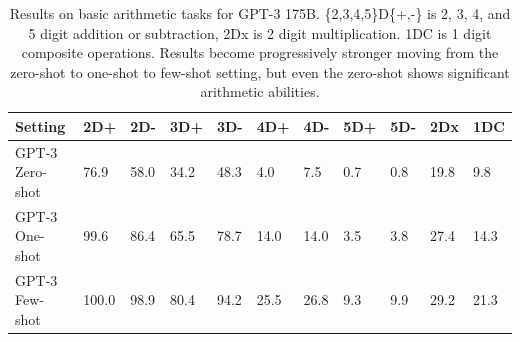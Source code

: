 \begin{table}
    \centering
        \begin{tabular}{l l l l l l l l l l l}
        \toprule
        Setting & 2D+ & 2D- & 3D+ & 3D- & 4D+ & 4D- & 5D+ & 5D- & 2Dx & 1DC \\ 
        \midrule
        GPT-3 Zero-shot & 76.9 & 58.0 & 34.2 & 48.3 & 4.0 & 7.5 & 0.7 & 0.8 & 19.8 & 9.8 \\ 
        GPT-3 One-shot & 99.6 & 86.4 & 65.5 & 78.7 & 14.0 & 14.0 & 3.5 & 3.8 & 27.4 & 14.3 \\ 
        GPT-3 Few-shot & 100.0 & 98.9 & 80.4 & 94.2 & 25.5 & 26.8 & 9.3 & 9.9 & 29.2 & 21.3 \\ 
        \bottomrule
        \end{tabular}
    \caption{Results on basic arithmetic tasks for GPT-3 175B. \{2,3,4,5\}D\{+,-\} is 2, 3, 4, and 5 digit addition or subtraction, 2Dx is 2 digit multiplication.  1DC is 1 digit composite operations.  Results become progressively stronger moving from the zero-shot to one-shot to few-shot setting, but even the zero-shot shows significant arithmetic abilities.}
    \label{table:arithmetic}
\end{table}